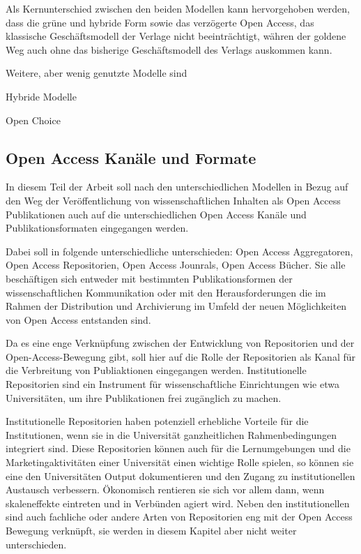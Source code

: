 Als Kernunterschied zwischen den beiden Modellen kann hervorgehoben werden, dass die grüne und hybride Form sowie das verzögerte Open Access, das klassische Geschäftsmodell der Verlage nicht beeinträchtigt, währen der goldene Weg auch ohne das bisherige Geschäftsmodell des Verlags auskommen kann\cite{lewis_2012_inevitability}.

Weitere, aber wenig genutzte Modelle sind

Hybride Modelle

Open Choice \cite{Hess_2006} 

\subsection{Open Access Kanäle und Formate}
In diesem Teil der Arbeit soll nach den unterschiedlichen Modellen in Bezug auf den Weg der Veröffentlichung von wissenschaftlichen Inhalten als Open Access Publikationen auch auf die unterschiedlichen Open Access Kanäle und Publikationsformaten eingegangen werden.

Dabei soll in folgende unterschiedliche unterschieden: Open Access Aggregatoren, Open Access Repositorien, Open Access Jounrals, Open Access Bücher. Sie alle beschäftigen sich entweder mit bestimmten Publikationsformen der wissenschaftlichen Kommunikation oder mit den Herausforderungen die im Rahmen der Distribution und Archivierung im Umfeld der neuen Möglichkeiten von Open Access entstanden sind. 

Da es eine enge Verknüpfung zwischen der Entwicklung von Repositorien und der Open-Access-Bewegung gibt\cite{offhaus_2012_institutionelle_repos}, soll hier auf die Rolle der Repositorien als Kanal für die Verbreitung von Publiaktionen eingegangen werden. Institutionelle Repositorien sind ein Instrument für wissenschaftliche Einrichtungen wie etwa Universitäten, um ihre Publikationen frei zugänglich zu machen\cite{dobratz_2007_open}.

Institutionelle Repositorien haben potenziell erhebliche Vorteile für die Institutionen, wenn sie in die Universität ganzheitlichen Rahmenbedingungen integriert sind\cite{steele_2006}. Diese Repositorien können auch für die Lernumgebungen und die Marketingaktivitäten einer Universität einen wichtige Rolle spielen, so können sie eine den Universitäten Output dokumentieren und den Zugang zu institutionellen Austausch verbessern\cite{steele_2006}. Ökonomisch rentieren sie sich vor allem dann, wenn skaleneffekte eintreten und in Verbünden agiert wird.\cite{blythe_2005value} Neben den institutionellen sind auch fachliche oder andere Arten von Repositorien eng mit der Open Access Bewegung verknüpft, sie werden in diesem Kapitel aber nicht weiter unterschieden.

